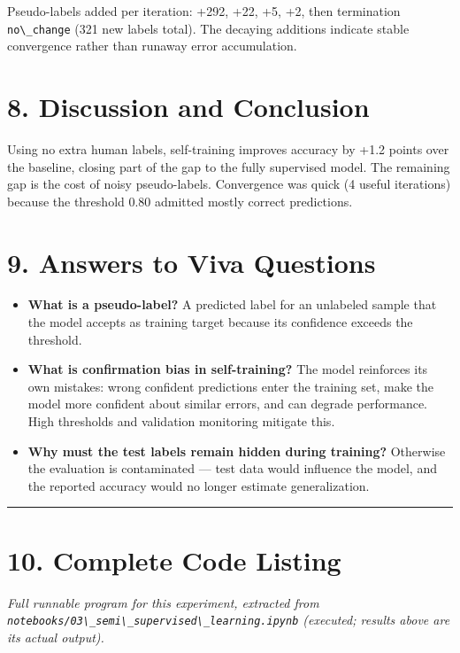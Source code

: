 Pseudo-labels added per iteration: +292, +22, +5, +2, then termination
\passthrough{\lstinline!no\_change!} (321 new labels total). The
decaying additions indicate stable convergence rather than runaway error
accumulation.

\section{8. Discussion and Conclusion}\label{discussion-and-conclusion}

Using no extra human labels, self-training improves accuracy by +1.2
points over the baseline, closing part of the gap to the fully
supervised model. The remaining gap is the cost of noisy pseudo-labels.
Convergence was quick (4 useful iterations) because the threshold 0.80
admitted mostly correct predictions.

\section{9. Answers to Viva Questions}\label{answers-to-viva-questions}

\begin{itemize}
\tightlist
\item
  \textbf{What is a pseudo-label?} A predicted label for an unlabeled
  sample that the model accepts as training target because its
  confidence exceeds the threshold.
\item
  \textbf{What is confirmation bias in self-training?} The model
  reinforces its own mistakes: wrong confident predictions enter the
  training set, make the model more confident about similar errors, and
  can degrade performance. High thresholds and validation monitoring
  mitigate this.
\item
  \textbf{Why must the test labels remain hidden during training?}
  Otherwise the evaluation is contaminated --- test data would influence
  the model, and the reported accuracy would no longer estimate
  generalization.
\end{itemize}

\begin{center}\rule{0.5\linewidth}{0.5pt}\end{center}

\section{10. Complete Code Listing}\label{complete-code-listing}

\emph{Full runnable program for this experiment, extracted from
\passthrough{\lstinline!notebooks/03\_semi\_supervised\_learning.ipynb!}
(executed; results above are its actual output).}

